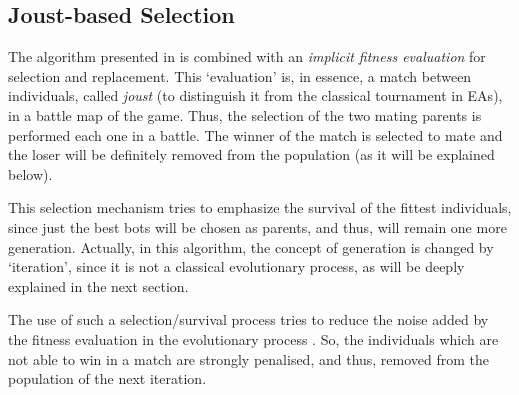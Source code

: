 \documentclass[conference]{IEEEtran}
\begin{document}


\subsection{Joust-based Selection}
The algorithm presented in \cite{GarciaGP14} %
is combined with an \textit{implicit fitness evaluation} for selection and
replacement. This `evaluation' is, in essence, a match between individuals, called {\em joust} (to distinguish it from the classical tournament in EAs), in a battle map of the game.
Thus, the selection of the two mating parents is performed each one in a battle. The winner of the match is selected to mate
and the loser will be definitely removed from the population (as it will be explained below).



This selection mechanism tries to emphasize the survival of the fittest individuals, since just the best bots will be chosen as parents, and thus, will remain one more generation. Actually, in this algorithm, the concept of generation is changed by `iteration', since it is not a classical evolutionary process, as will be deeply explained in the next section.

The use of such a selection/survival process tries to reduce the noise added by the fitness evaluation in the evolutionary process \cite{Genebot_JCST}. So, the individuals which are not able to win in a match are strongly penalised, and thus, removed from the population of the next iteration.
\end{document}
